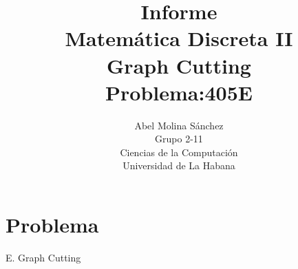 \documentclass[12pt]{article}
\begin{document}
  \title{Informe\\
  Matem\'atica Discreta II\\
     Graph Cutting\\
     Problema:405E}
  \author{Abel Molina S\'anchez\\
  Grupo 2-11\\
  Ciencias de la Computaci\'on\\
  Universidad de La Habana}
    \maketitle  

\newpage

\section{Problema}
\begin{center}
 E. Graph Cutting
\end{center}
\end{document}
